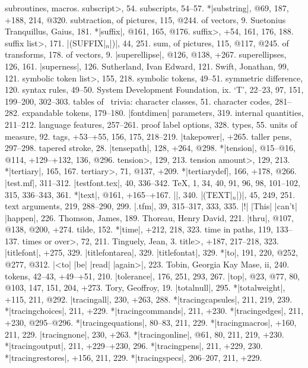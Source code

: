subroutines, \see macros.
\<subscript>, 54.
subscripts, 54--57.
*|substring|, @69, 187, +188, 214, @320.
subtraction, of pictures, 115, @244.
\sub of vectors, 9.
Suetonius Tranquillus, Gaius, 181.
*|suffix|, @161, 165, @176.
\<suffix>, +54, 161, 176, 188.
\<suffix list>, 171.
|(SUFFIX|$_n$|)|, 44, 251.
sum, of pictures, 115, @117, @245.
\sub of transforms, 178.
\sub of vectors, 9.
|superellipse|, @126, @138, +267.
superellipses, 126, 161.
|superness|, 126.
Sutherland, Ivan Edward, 121.
Swift, Jonathan, 99, 121.
\<symbolic token list>, 155, 218.
symbolic tokens, 49--51.
symmetric difference, 120.
syntax rules, 49--50.
System Development Foundation, ix.
\newletter
`T', 22--23, 97, 151, 199--200, 302--303.
tables of \MF\ trivia:
\sub character classes, 51.
\sub character codes, 281--282.
\sub expandable tokens, 179--180.
\sub |fontdimen| parameters, 319.
\sub internal quantities, 211--212.
\sub language features, 257--261.
\sub proof\/ label options, 328.
\sub types, 55.
\sub units of measure, 92.
tags, +53--+55, 156, 175, 218--219.
|takepower|, +265.
taller pens, 297--298.
tapered stroke, 28.
|tensepath|, 128, +264, @298.
*|tension|, @15--@16, @114, +129--+132, 136, @296.
\<tension>, 129, 213.
\<tension amount>, 129, 213.
*|tertiary|, 165, 167.
\<tertiary>, 71, @137, +209.
*|tertiarydef|, 166, +178, @266.
|test.mf|, 311--312.
|testfont.tex|, 40, 336--342.
\TeX, 1, 34, 40, 91, 96, 98, 101--102, 315, 336--343, 361.
*|text|, @161, +165--+167.
|\text|, 340.
|(TEXT|$_n$|)|, 45, 249, 251.
text arguments, 219, 288--290, 299.
|.tfm|, 39, 315--317, 333, 335.
|!| |This| |can't| |happen|, 226.
Thomson, James, 189.
Thoreau, Henry David, 221.
|thru|, @107, @138, @200, +274.
tilde, 152.
*|time|, +212, 218, 323.
time in paths, 119, 133--137.
\<times or over>, 72, 211.
Tinguely, Jean, 3.
\<title>, +187, 217--218, 323.
|titlefont|, +275, 329.
|titlefontarea|, 329.
|titlefontat|, 329.
*|to|, 191, 220, @252, @277, @312.
|<to| |be| |read| |again>|, 223.
Tobin, Georgia Kay Mase, ii, 240.
tokens, 42--43, +49--+51, 210.
|tolerance|, 176, 251, 293, 267.
|top|, @23, @77, 80, @103, 147, 151, 204, +273.
Tory, Geoffroy, 19.
|totalnull|, 295.
*|totalweight|, +115, 211, @292.
|tracingall|, 230, +263, 288.
*|tracingcapsules|, 211, 219, 239.
*|tracingchoices|, 211, +229.
*|tracingcommands|, 211, +230.
*|tracingedges|, 211, +230, @295--@296.
*|tracingequations|, 80--83, 211, 229.
*|tracingmacros|, +160, 211, 229.
|tracingnone|, 230, +263.
*|tracingonline|, @61, 80, 211, 219, +230.
*|tracingoutput|, 211, +229--+230, 296.
*|tracingpens|, 211, +229, 230.
*|tracingrestores|, +156, 211, 229.
*|tracingspecs|, 206--207, 211, +229.

